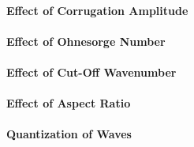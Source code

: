 \paragraph{Effect of Corrugation Amplitude}
\blindtext

\paragraph{Effect of Ohnesorge Number}
\blindtext

\paragraph{Effect of Cut-Off Wavenumber}
\blindtext

\paragraph{Effect of Aspect Ratio}
\blindtext

\paragraph{Quantization of Waves}
\blindtext

